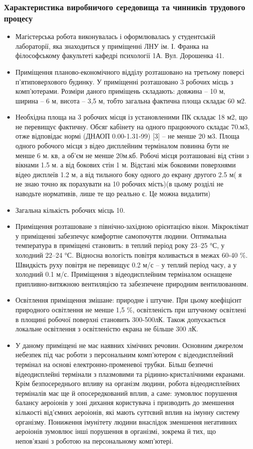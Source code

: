 \documentclass[12pt,a4paper]{article}
\begin{document}
\subsubsection{Характеристика виробничого середовища та чинників трудового процесу}
\begin{itemize}
\item Магістерська робота виконувалась і оформлювалась у студентській лабораторії, яка знаходиться у приміщенні ЛНУ ім. І. Франка на філософському факультеті кафедрі психології 1А. Вул. Дорошенка 41.
\item Приміщення планово-економічного відділу розташовано на третьому поверсі п'ятиповерхового будинку. У приміщенні розташовано 3 робочих місць з комп’ютерами. Розміри даного приміщень складають: довжина – 10 м, ширина – 6 м, висота – 3,5 м, тобто загальна фактична площа складає 60 м2.
\item Необхідна площа на 3 робочих місця із установленими ПК складає 18 м2, що не перевищує фактичну. Обсяг кабінету на одного працюючого складає 70.м3, отже відповідає нормі (ДНАОП 0.00-1.31-99) [3] – не менше 20 м3. Площа одного робочого місця з відео дисплейним терміналом повинна бути не менше 6 м. кв, а об’єм не менше 20м.кб. Робочі місця розташовані від стіни з вікнами 1.5 м. а від бокових стін 1 м. Відстані між боковими поверхнями відео дисплеїв 1.2 м, а від тильного боку одного до екрану другого 2.5 м( я не знаю точно як порахувати на 10 робочих мість)(в цьому розділі  не наводьте нормативів, лише  те що реально  є. Це можна видалити)
\item Загальна кількість робочих місць 10.
\item Приміщення розташоване з північно-західною орієнтацією вікон. Мікроклімат у приміщенні забезпечує комфортне самопочуття людини. Оптимальна температура в приміщені становить: в теплий період року 23–25 °С, у холодний 22–24 °С. Відносна вологість повітря коливається в межах 60-40 \%. Швидкість руху повітря не перевищує 0.2 м/с – у теплий період часу, а у холодний 0.1 м/с. Приміщення з відеодисплейним терміналом оснащене припливно-витяжною вентиляцією та забезпечене природним вентилюванням.
\item Освітлення приміщення змішане: природне і штучне. При цьому коефіцієнт природного освітлення не менше 1,5 \%, освітленість при штучному освітлені в площині робочої поверхні становить 300-500лК. Також допускається локальне освітлення з освітленістю екрана не більше 300 лК.
\item У даному приміщені не має наявних хімічних речовин. Основним джерелом небезпек під час роботи з персональним комп’ютером є відеодисплейний термінал на основі електронно-променевої трубки. Більш безпечні відеодисплейні термінали з плазмовими та рідинно-кристалічними екранами. Крім безпосереднього впливу на організм людини, робота відеодисплейних терміналів має ще й опосередкований вплив, а саме: зумовлює порушення балансу аероіонів у зоні дихання користувача і призводить до зменшення кількості від’ємних аероіонів, які мають суттєвий вплив на імунну систему організму. Пониження імунітету людини внаслідок зменшення негативних аероіонів зумовлює інші порушення в організмі, зокрема й тих, що непов’язані з роботою на персональному комп’ютері.

\end{itemize}
\end{document}
